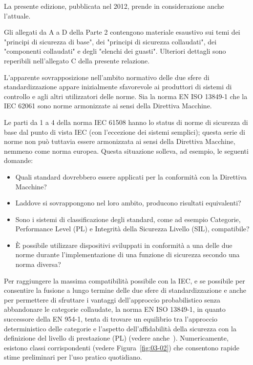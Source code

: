 La presente edizione, pubblicata nel 2012, prende in considerazione anche l'attuale.

Gli allegati da A a D della Parte 2 contengono materiale esaustivo sui temi dei "principi di sicurezza di base", dei "principi di sicurezza collaudati", dei "componenti collaudati" e degli "elenchi dei guasti". Ulteriori dettagli sono reperibili nell'allegato C della presente relazione.

L'apparente sovrapposizione nell'ambito normativo delle due sfere di standardizzazione appare inizialmente sfavorevole ai produttori di sistemi di controllo e agli altri utilizzatori delle norme. Sia la norma EN ISO 13849-1 che la IEC 62061 sono norme armonizzate ai sensi della Direttiva Macchine.

Le parti da 1 a 4 della norma IEC 61508 hanno lo status di norme di sicurezza di base dal punto di vista IEC (con l'eccezione dei sistemi semplici); questa serie di norme non può tuttavia essere armonizzata ai sensi della Direttiva Macchine, nemmeno come norma europea. Questa situazione solleva, ad esempio, le seguenti domande:
\begin{itemize}
    \item Quali standard dovrebbero essere applicati per la conformità con la Direttiva Macchine?
    \item Laddove si sovrappongono nel loro ambito, producono risultati equivalenti?
    \item Sono i sistemi di classificazione degli standard, come ad esempio Categorie, Performance Level (PL) e Integrità della Sicurezza Livello (SIL), compatibile?
    \item È possibile utilizzare dispositivi sviluppati in conformità a una delle due norme durante l'implementazione di una funzione di sicurezza secondo una norma diversa?
\end{itemize}
Per raggiungere la massima compatibilità possibile con la IEC, e se possibile per consentire la fusione a lungo termine delle due sfere di standardizzazione e anche per permettere di sfruttare i vantaggi dell'approccio probabilistico senza abbandonare le categorie collaudate, la norma EN ISO 13849-1, in quanto successore della EN 954-1, tenta di trovare un equilibrio tra l'approccio deterministico delle categorie e l'aspetto dell'affidabilità della sicurezza con la definizione del livello di prestazione (PL) (vedere anche~\cite{hauke2006}). Numericamente, esistono classi corrispondenti (vedere Figura~\ref{fig:03-02}) che consentono rapide stime preliminari per l'uso pratico quotidiano.

